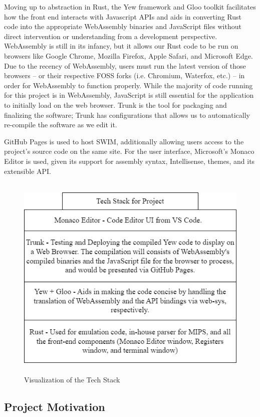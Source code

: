\documentclass[
    paper=letter,
    parskip=half,
    fontsize=12pt,
    titlepage=firstiscover,
    toc=bibliography,
    numbers=endperiod
]{scrartcl}
\begin{document}
Moving up to abstraction in Rust, the Yew framework \cite{yew} and Gloo
toolkit \cite{gloo} facilitates how the front end interacts with
Javascript APIs and aids in converting Rust code into the appropriate
WebAssembly binaries and JavaScript files without direct intervention or
understanding from a development perspective. WebAssembly
\cite{webassembly} is still in its infancy, but it allows our Rust code
to be run on browsers like Google Chrome, Mozilla Firefox, Apple Safari,
and Microsoft Edge. Due to the recency of WebAssembly, users must run
the latest version of those browsers – or their respective FOSS forks
(i.e. Chromium, Waterfox, etc.) – in order for WebAssembly to function
properly. While the majority of code running for this project is in
WebAssembly, JavaScript is still essential for the application to
initially load on the web browser. Trunk \cite{trunk} is the tool for
packaging and finalizing the software; Trunk has configurations that
allows us to automatically re-compile the software as we edit it.

GitHub Pages is used to host SWIM, additionally allowing users access to
the project's source code on the same site. For the user interface,
Microsoft's Monaco Editor is used, given its support for assembly
syntax, Intellisense, themes, and its extensible API.

\begin{figure}[H]
    \includegraphics[height=10cm]{tech-stack}
    \caption{Visualization of the Tech Stack}
\end{figure}

\subsection{Project Motivation}
\end{document}
